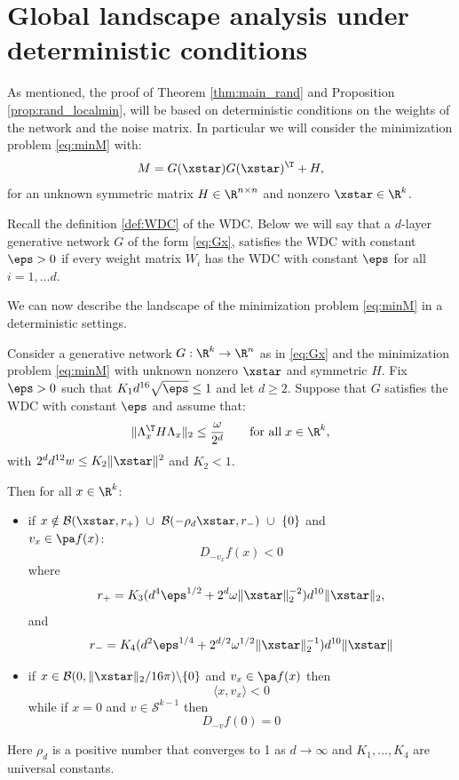 \section{Global landscape analysis under deterministic conditions}

As mentioned, the proof of Theorem \ref{thm:main_rand} and Proposition \ref{prop:rand_localmin}, will be based on deterministic conditions on 
the weights of the network and the noise matrix.
In particular we will consider the minimization problem \eqref{eq:minM} with: \[M = G(\xstar)G(\xstar)^\T + H,\] for an unknown symmetric matrix $H \in \R^{n \times n}$ and nonzero $\xstar \in \R^k$. 

Recall the definition \ref{def:WDC} of the WDC.
Below we will say that a $d$-layer generative network $G$ of the form \eqref{eq:Gx}, satisfies the WDC with constant $\eps>0$ if every weight matrix $W_i$ has the WDC with constant 
$\eps$ for all $i = 1, \dots d$.

We can now describe the landscape of the minimization problem \eqref{eq:minM} in a deterministic settings. 
\begin{thm}\label{thm:dir_deriv}
	
	Consider a generative network $G: \R^k \to \R^n$ as in \eqref{eq:Gx} and 
	the minimization problem \eqref{eq:minM} with unknown nonzero $\xstar$ and symmetric $H$.
	Fix $\eps > 0$ such that $K_1 d^{16} \sqrt{\eps} \leq 1$ and let $d \geq 2$. 
	Suppose that $G$ satisfies the WDC with constant $\eps$ and assume that:
	\begin{equation}\label{eq:noise}
	\|\Lambda_x^\T H \Lambda_x \|_2 \leq \frac{\omega}{2^d}  \qquad \text{for all}\; x \in \R^k, %
	\end{equation}
	with $2^d d^{12} w \leq K_2 \| \xstar \|^2$ and $K_2 < 1$. 
	
	Then for all $x \in \R^k$:
	\begin{itemize}
		\item if $x \notin \mathcal{B}(\xstar, r_+)~\cup~\mathcal{B}(-\rho_d \xstar, r_-)~\cup~\{0\}$ and \\$v_x \in \pa f(x)$:
		\[
		D_{-v_x} f(x) < 0
		\]
		where 
		\[
		r_+ = K_3 (d^4 {\eps^{1/2}} + 2^d \omega  \|\xstar\|_2^{-2}) d^{10} \|\xstar\|_2,
		\]
		and
		\[
		r_- =  K_4 (d^2 {\eps}^{1/4} + 2^{d/2} \omega^{1/2} \|\xstar\|_2^{-1}) d^{10}  \|\xstar\|
		\]
		\item if $x \in \mathcal{B}(0,  \|\xstar\|_2/16 \pi) \backslash \{0\}$  and $v_x \in \pa f(x)$ then 
		\[\langle x, v_x\rangle < 0\]
		while if $x = 0$ and $v \in \mathcal{S}^{k-1}$ then 
		\[D_{-v} f(0) = 0\]
	\end{itemize} 
	Here $\rho_d$ is a positive number that converges to 1 as $d \to \infty$ and $K_1, \dots, K_4$ are universal constants.
\end{thm}

